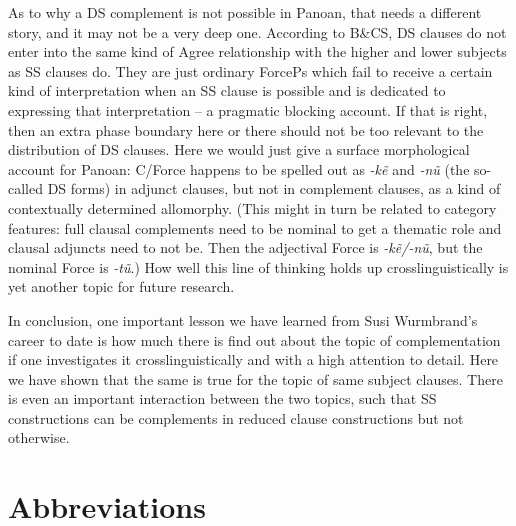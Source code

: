 \documentclass[output=paper]{langscibook}
\begin{document}
As to why a DS complement is not possible in Panoan, that needs a different story, and it may not be a very deep one. According to B\&CS, DS clauses do not enter into the same kind of Agree relationship with the higher and lower subjects as SS clauses do. They are just ordinary ForcePs which fail to receive a certain kind of interpretation when an SS clause is possible and is dedicated to expressing that interpretation – a pragmatic blocking account. If that is right, then an extra phase boundary here or there should not be too relevant to the distribution of DS clauses. Here we would just give a surface morphological account for Panoan: C/Force happens to be spelled out as \textit{-kẽ} and \textit{-nũ} (the so-called DS forms) in adjunct clauses, but not in complement clauses, as a kind of contextually determined allomorphy. (This might in turn be related to category features: full clausal complements need to be nominal to get a thematic role and clausal adjuncts need to not be. Then the adjectival Force is \textit{-kẽ/-nũ}, but the nominal Force is \textit{-tũ}.) How well this line of thinking holds up crosslinguistically is yet another topic for future research.

In conclusion, one important lesson we have learned from Susi Wurmbrand’s career to date is how much there is find out about the topic of complementation if one investigates it crosslinguistically and with a high attention to detail. Here we have shown that the same is true for the topic of same subject clauses. There is even an important interaction between the two topics, such that SS constructions can be complements in reduced clause constructions but not otherwise.


\section*{Abbreviations}
\end{document}
